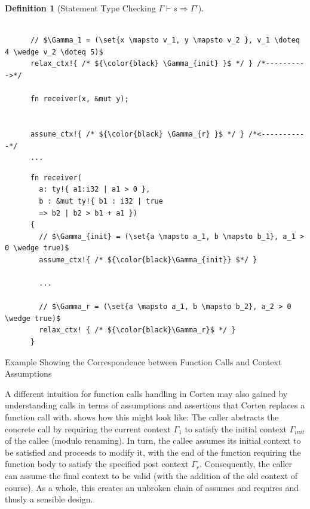 \documentclass[twoside, english, final]{sdqthesis}
\newcommand{\set}[1]{\left\{ #1 \right\}}
\theoremstyle{definition}
\newtheorem{definition}[theorem]{Definition}
\begin{document}
\begin{definition}[Statement Type Checking $\Gamma \vdash s \Rightarrow \Gamma'$]
\begin{listing}[h]
\begin{minipage}[t]{0.48\linewidth}
\begin{verbatim}
      
      // $\Gamma_1 = (\set{x \mapsto v_1, y \mapsto v_2 }, v_1 \doteq 4 \wedge v_2 \doteq 5)$
      relax_ctx!{ /* ${\color{black} \Gamma_{init} }$ */ } /*---------->*/

      fn receiver(x, &mut y);

      
      assume_ctx!{ /* ${\color{black} \Gamma_{r} }$ */ } /*<-----------*/
      ...
    \end{verbatim}
  \end{minipage}
  \begin{minipage}[t]{0.48\linewidth}
    \begin{verbatim}
      fn receiver(
        a: ty!{ a1:i32 | a1 > 0 },
        b : &mut ty!{ b1 : i32 | true
        => b2 | b2 > b1 + a1 }) 
      {
        // $\Gamma_{init} = (\set{a \mapsto a_1, b \mapsto b_1}, a_1 > 0 \wedge true)$
        assume_ctx!{ /* ${\color{black}\Gamma_{init}} $*/ }

        ...

        // $\Gamma_r = (\set{a \mapsto a_1, b \mapsto b_2}, a_2 > 0 \wedge true)$
        relax_ctx! { /* ${\color{black}\Gamma_r}$ */ }
      }
    \end{verbatim}
  \end{minipage}
  \caption{Example Showing the Correspondence between Function Calls and Context Assumptions}
  \label{lst:example-correspondence-subcontext}
\end{listing}

A different intuition for function calls handling in Corten may also gained by understanding calls in terms of assumptions  and assertions  that Corten replaces a function call with.  shows how this might look like: The caller abstracts the concrete call by requiring the current context $\Gamma_1$ to satisfy the initial context $\Gamma_{init}$ of the callee (modulo renaming). In turn, the callee assumes its initial context to be satisfied and proceeds to modify it, with the end of the function requiring the function body to satisfy the specified post context $\Gamma_r$. Consequently, the caller can assume the final context to be valid (with the addition of the old context of course). As a whole, this creates an unbroken chain of assumes and requires and thusly a sensible design.

\end{definition}

\end{document}
